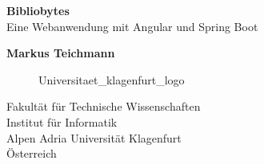 \begin{titlepage}
    \begin{center}
        \vspace*{1cm}
        \Huge
        \textbf{Bibliobytes}\\
        \LARGE
        \vspace{0.5cm}
        Eine Webanwendung mit Angular und Spring Boot

        \vspace{1.5cm}
        \textbf{Markus Teichmann \vspace{-1.1cm} \\ \hspace{4.5cm} \footnotesize \footnotemark}

        \Large

        \vspace{3cm}

        \begin{figure}[htp]
            \centering
            {Universitaet_klagenfurt_logo}
        \end{figure}
        Fakultät für Technische Wissenschaften\\
        Institut für Informatik\\
        Alpen Adria Universität Klagenfurt\\
        Österreich\\
        \datumVonHeute

    \end{center}
\end{titlepage}

